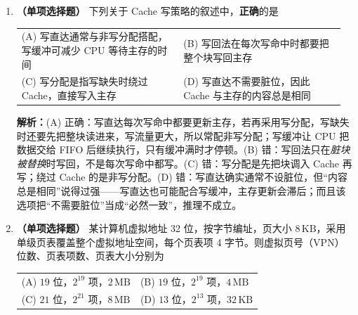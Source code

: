 \begin{enumerate}[leftmargin=*]
\ifshowsolutions\par\noindent\textbf{解析：}先算行数和组数：
\[
\text{行数}=\frac{64\,\mathrm{KB}}{32\,\mathrm{B}}=2048=2^{11},\qquad
\text{组数}=\frac{2048}{4}=512=2^{9}.
\]
块内偏移 $=\log_2 32=5$ 位，组号 $=9$ 位，Tag $=32-9-5=18$ 位。

（注意：这里的 Tag 是 18 位，而不是 $32-11-5=16$ 位——4 路组相联下索引只到“组”，同一组内的 4 行共享组号。）

总容量由四部分组成：
\[
\underbrace{64\,\mathrm{KB}}_{\text{数据}}
+\underbrace{2048\times\frac{18}{8}\,\mathrm{B}}_{\text{Tag}}
+\underbrace{2048\times\frac{1}{8}\,\mathrm{B}}_{\text{有效位}}
+\underbrace{2048\times\frac{1}{8}\,\mathrm{B}}_{\text{脏位}}
=65\,536+4\,608+256+256=70\,656\ \mathrm{B}.
\]
\else \answerarea[6] \fi

\item \textbf{（单项选择题）} 下列关于 Cache 写策略的叙述中，\textbf{正确}的是

\begin{center}\small
\begin{tabular}{@{}p{0.48\linewidth}p{0.48\linewidth}@{}}
(A) 写直达通常与非写分配搭配，写缓冲可减少 CPU 等待主存的时间 & (B) 写回法在每次写命中时都要把整个块写回主存 \\[4pt]
(C) 写分配是指写缺失时绕过 Cache，直接写入主存 & (D) 写直达不需要脏位，因此 Cache 与主存的内容总是相同
\end{tabular}
\end{center}

\ifshowsolutions\par\noindent\textbf{解析：}(A) 正确：写直达每次写命中都要更新主存，若再采用写分配，写缺失时还要先把整块读进来，写流量更大，所以常配非写分配；写缓冲让 CPU 把数据交给 FIFO 后继续执行，只有缓冲满时才停顿。(B) 错：写回法只在\emph{脏块被替换}时写回，不是每次写命中都写。(C) 错：写分配是先把块调入 Cache 再写；绕过 Cache 的是非写分配。(D) 错：写直达确实通常不设脏位，但“内容总是相同”说得过强——写直达也可能配合写缓冲，主存更新会滞后；而且该选项把“不需要脏位”当成“必然一致”，推理不成立。\else \answerarea \fi

\item \textbf{（单项选择题）} 某计算机虚拟地址 32 位，按字节编址，页大小 $8\,\mathrm{KB}$，采用单级页表覆盖整个虚拟地址空间，每个页表项 4 字节。则虚拟页号（VPN）位数、页表项数、页表大小分别为

\begin{center}
\begin{tabular}{ll}
(A) $19$ 位，$2^{19}$ 项，$2\,\mathrm{MB}$ & (B) $19$ 位，$2^{19}$ 项，$4\,\mathrm{MB}$ \\[4pt]
(C) $21$ 位，$2^{21}$ 项，$8\,\mathrm{MB}$ & (D) $13$ 位，$2^{13}$ 项，$32\,\mathrm{KB}$
\end{tabular}
\end{center}


\end{enumerate}
